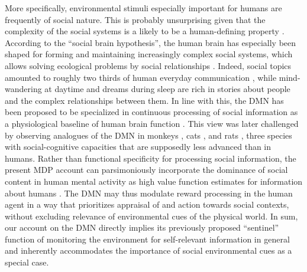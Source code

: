 \documentclass[10pt,letterpaper]{article}
\begin{document}
More specifically,
environmental stimuli especially important for humans are frequently of
social nature. This is probably unsurprising
given that
the complexity of the social systems
is a likely to be a human-defining property
\citep{tomasello2009cultural}.
According to the ``social brain hypothesis'',
the human brain has especially been shaped for
forming and maintaining increasingly complex
social systems,
which allows solving ecological problems by social relationships
\citep{whiten1988machiavellian}.
Indeed, social topics amounted to roughly
two thirds of human everyday communication \citep{dunbar1997human},
while
mind-wandering at daytime and dreams during sleep
are rich in stories about people and
the complex relationships between them.
%
In line with this, the DMN has been proposed to be specialized in
continuous processing of social information as a
physiological baseline of human brain function
\citep{schilbach2008minds}. This view was later challenged by observing
analogues of the DMN in monkeys \citep{mantini2011default},
cats \citep{popa2009contrasting},
and rats \citep{lu2012rat}, three species with
social-cognitive capacities that are supposedly less advanced than in humans.
Rather than functional specificity for processing social information,
the present MDP account can parsimoniously incorporate
the dominance of social content in
human mental activity
as high value function estimates for information about humans
\citep{baker2009action, kampe2001psychology, krienen2010clan}.
The DMN may thus modulate reward processing
in the human agent in a way that prioritizes
appraisal of and action towards social contexts,
without excluding relevance of environmental cues of the physical world.
In sum,
our account on the DMN directly implies
its previously proposed ``sentinel'' function
of monitoring the environment for self-relevant information
in general and
inherently accommodates the importance of social environmental cues
as a special case.
\end{document}
